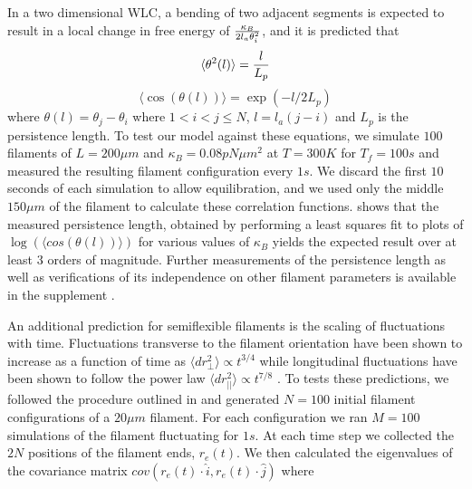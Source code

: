 \documentclass[11pt]{article}
\begin{document}
In a two dimensional WLC, a bending of two adjacent segments is expected to result in a local change in free energy of ${\kappa_B\over2l_a\theta_i^2}$, and it is predicted that \cite{frontali1979}
\begin{equation}
  \langle\theta^2(l)\rangle = {l\over L_p}
  \label{eqn:thsq}
\end{equation}
\begin{equation} 
  \langle\cos(\theta(l))\rangle = \exp{(-l/2L_p)}
  \label{eqn:costh}
\end{equation} 
where $\theta(l) = \theta_j - \theta_i$ where $1<i<j\le N$, $l = l_a(j-i)$ and $L_p$ is the persistence length. To test our model against these equations, we simulate $100$ filaments of $L=200\mu m$ and $\kappa_B=0.08 pN\mu m^2$ at $T=300K$ for $T_f = 100s$ and measured the resulting filament configuration every $1s$. We discard the first $10$ seconds of each simulation to allow equilibration, and we used only the middle $150 \mu m$ of the filament to calculate these correlation functions.
 shows that the measured persistence length, obtained by performing a least squares fit to plots of $\log{(\langle cos(\theta(l))\rangle )} $ for various values of $\kappa_B$ yields the expected result over at least $3$ orders of magnitude. Further measurements of the persistence length as well as verifications of its independence on other filament parameters is available in the supplement .
\par
An additional prediction for semiflexible filaments is the scaling of fluctuations with time. 
Fluctuations transverse to the filament orientation have been 
shown to increase as a function of time as $\langle dr_{\perp}^2\rangle\propto t^{3/4}$ while longitudinal fluctuations have been shown to follow the power law
$\langle dr_{||}^2\rangle\propto t^{7/8}$ \cite{everaers1999}. To tests these predictions, we followed the procedure outlined in
\cite{everaers1999} and generated $N = 100$ initial filament configurations of a $20\mu m$ filament. For each configuration we ran $M = 100$ simulations of the filament fluctuating for $1s$. At each time step we collected the $2N$ positions of the filament ends, $r_e(t)$. We then calculated the eigenvalues of the covariance matrix $cov(r_e(t)\cdot \hat{i},r_e(t)\cdot \hat{j})$ where
\end{document}
